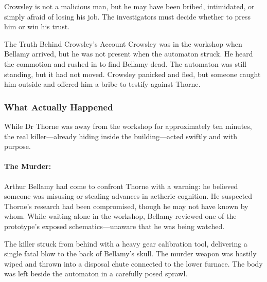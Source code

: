Crowsley is not a malicious man, but he may have been bribed, intimidated, or simply afraid of losing his job. The investigators must decide whether to press him or win his trust.

\begin{CommentBox}{The Truth Behind Crowsley’s Account}
    Crowsley was in the workshop when Bellamy arrived, but he was not present when the automaton struck. He heard the commotion and rushed in to find Bellamy dead. The automaton was still standing, but it had not moved. Crowsley panicked and fled, but someone caught him outside and offered him a bribe to testify against Thorne.
\end{CommentBox}


\subsubsection*{What Actually Happened}
While Dr Thorne was away from the workshop for approximately ten minutes, the real killer—already hiding inside the building—acted swiftly and with purpose.

\paragraph{The Murder:}
Arthur Bellamy had come to confront Thorne with a warning: he believed someone was misusing or stealing advances in aetheric cognition. He suspected Thorne’s research had been compromised, though he may not have known by whom. While waiting alone in the workshop, Bellamy reviewed one of the prototype’s exposed schematics—unaware that he was being watched.

The killer struck from behind with a heavy gear calibration tool, delivering a single fatal blow to the back of Bellamy’s skull. The murder weapon was hastily wiped and thrown into a disposal chute connected to the lower furnace. The body was left beside the automaton in a carefully posed sprawl.

